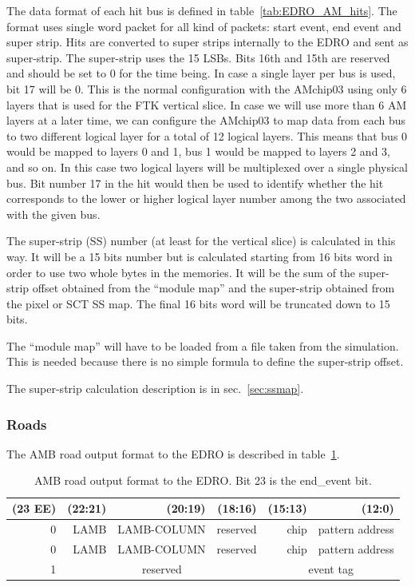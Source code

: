 \documentclass[10pt]{article}
\numberwithin{figure}{section}
\numberwithin{equation}{section}
\numberwithin{table}{section}
\newcommand{\0}{\phantom{0}}
\begin{document}
The data format of each hit bus is defined in table~\ref{tab:EDRO_AM_hits}. The format uses single word packet for all kind of packets: start event, end event and super strip. Hits are converted to super strips internally to the EDRO and sent as super-strip.
The super-strip uses the 15 LSBs. Bits 16th and 15th are reserved and should be set to 0 for the time being.
In case a single layer per bus is used, bit 17 will be 0. This is the normal configuration with the AMchip03 using only 6 layers that is used for the FTK vertical slice.
In case we will use more than 6 AM layers at a later time, we can configure the AMchip03 to map data from each bus to two different logical layer for a total of 12 logical layers. This means that bus 0 would be mapped to layers 0 and 1, bus 1 would be mapped to layers 2 and 3, and so on. In this case two logical layers will be multiplexed over a single physical bus. Bit number 17 in the hit would then be used to identify whether the hit corresponds to the lower or higher logical layer number among the two associated with the given bus. 

The super-strip (SS) number (at least for the vertical slice) is calculated in this way. 
It will be a 15 bits number but is calculated starting from 16 bits word in order to use two whole bytes in the memories.
It will be the sum of the super-strip offset obtained from the ``module map'' and the super-strip obtained from the pixel or SCT SS map. The final 16 bits word will be truncated down to 15 bits.

The ``module map'' will have to be loaded from a file taken from the simulation.
This is needed because there is no simple formula to define the super-strip offset.

The super-strip calculation description is in sec.~\ref{sec:ssmap}.

\subsubsection{Roads}

The AMB road output format to the EDRO is described in table~\ref{tab:SLIM-roads}.

\begin{table}
\begin{tabular}{r|r|r|r|r|r}
(23 EE) & (22:21) & (20:19) & (18:16) & (15:13) & (12:0) \\ \hline
 0 & LAMB & LAMB-COLUMN  & reserved & chip & pattern address \\ \hline 
 0 & LAMB & LAMB-COLUMN  & reserved & chip & pattern address \\ \hline
 1 & \multicolumn{3}{c|}{ reserved } & \multicolumn{2}{c}{ event tag }\\

\end{tabular}
\caption{\label{tab:SLIM-roads}AMB road output format to the EDRO. Bit 23 is the end\_event bit.}
\end{table}
\end{document}
